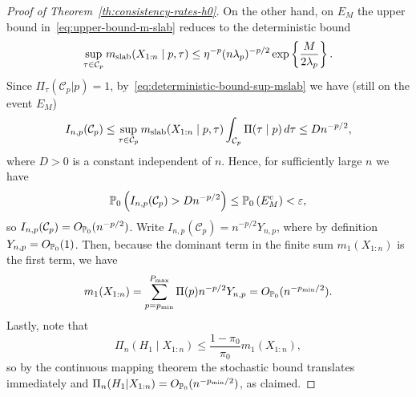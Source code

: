 \begin{proof}[Proof of Theorem~\ref{th:consistency-rates-h0}]
On the other hand, on \(E_{M}\) the upper bound in~\eqref{eq:upper-bound-m-slab} reduces to the deterministic bound
\begin{equation}\label{eq:deterministic-bound-sup-mslab}
\sup_{\tau \in \mathcal C_p} m_{\text{slab}}(X_{1:n}\mid p,\tau) \leq \eta^{-p}(n\lambda_p)^{-p/2}\exp\left\{\frac{M}{2\lambda_p}\right\}.
\end{equation}
Since \(\Pi_\tau(\mathcal C_p|p)= 1\), by~\eqref{eq:deterministic-bound-sup-mslab} we have (still on the event \(E_{M}\))
\[
I_{n,p}(\mathcal C_p)\leq \sup_{\tau\in\mathcal C_p} m_{\text{slab}}(X_{1:n}\mid p,\tau) \int_{\mathcal C_p} \Pi(\tau\mid p)\, d\tau \leq Dn^{-p/2},
\]
where \(D>0\) is a constant independent of \(n\). Hence, for sufficiently large \(n\) we have
\[
\mathbb{P}_0\left(I_{n,p}(\mathcal C_p) > Dn^{-p/2}\right) \leq \mathbb{P}_0\left(E_{M}^c \right) < \varepsilon,
\]
so \(I_{n,p}(\mathcal C_p)=O_{\mathbb{P}_0}(n^{-p/2})\). Write \(I_{n,p}(\mathcal C_p)=n^{-p/2}Y_{n,p}\), where by definition \(Y_{n,p}=O_{\mathbb{P}_0}(1)\). Then, because the dominant term in the finite sum \(m_1(X_{1:n})\) is the first term, we have
\[
m_1(X_{1:n}) = \sum_{p=p_{\min}}^{P_{\max}} \Pi(p) n^{-p/2}Y_{n,p} = O_{\mathbb{P}_0}(n^{-p_{\min}/2}).
\]
Lastly, note that
\[
\Pi_n(H_1\mid X_{1:n}) \leq \frac{1-\pi_0}{\pi_0}m_1(X_{1:n}),
\]
so by the continuous mapping theorem the stochastic bound translates immediately and \(\Pi_n(H_1|X_{1:n})=O_{\mathbb{P}_0}(n^{-p_{\min}/2})\), as claimed.
\end{proof}

